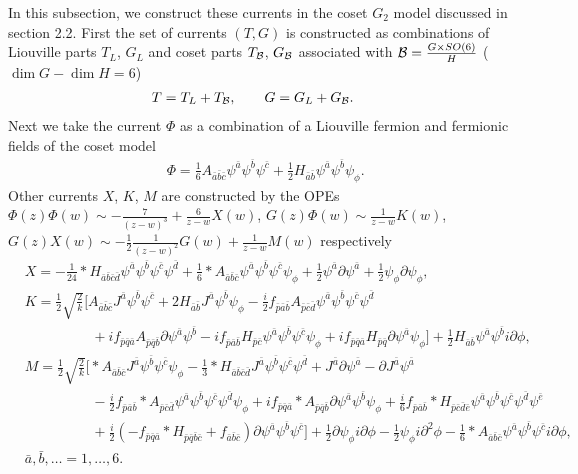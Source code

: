 \documentclass[a4paper,12pt]{article}
\numberwithin{equation}{section}
\newcommand{\del}{\partial}
\newcommand{\nn}{\nonumber}
\newcommand{\As}{*A}
\newcommand{\Hs}{*H}
\newcommand{\psil}{\psi_{\phi}}
\newcommand{\Jh}{J}
\newcommand{\Bcal}{{\cal B}}
\newcommand{\gh}[1]{\bar{#1}}
\newcommand{\ab}{\gh a}
\newcommand{\bb}{\gh b}
\newcommand{\cb}{\gh c}
\newcommand{\db}{\gh d}
\newcommand{\eb}{\gh e}
\newcommand{\pb}{\gh p}
\newcommand{\qb}{\gh q}
\begin{document}
In this subsection, we construct these currents in the coset $G_2$ model 
discussed in section 2.2. First the set of currents $(T,G)$ is 
constructed as combinations of Liouville parts $T_L$, $G_L$ 
and coset parts $T_{\cal B}$, $G_{\cal B}$ 
associated with 
${\cal B}=\frac{G\times SO(6)}{H}$ ($\dim G-\dim H =6$)
\begin{align*}
 &T=T_{L}+T_{\Bcal},\qquad G=G_{L}+G_{\Bcal}.
\end{align*}
Next we take the current $\Phi$ as 
a combination of a Liouville fermion and 
fermionic fields of the coset model
\begin{align*}
 &\Phi=\frac16 A_{\ab\bb\cb}\psi^{\ab}\psi^{\bb}\psi^{\cb}
         +\frac12 H_{\ab\bb}\psi^{\ab}\psi^{\bb}\psil .
\end{align*}
Other currents $X$, $K$, $M$ are constructed
 by the OPEs $\Phi(z)\Phi(w)\sim -\frac{7}{(z-w)^3}+\frac{6}{z-w}X(w)$, 
$G(z)\Phi(w)\sim \frac{1}{z-w}K(w)$, $G(z)X(w)\sim -\frac{1}{2}
\frac{1}{(z-w)^2}G(w)+\frac{1}{z-w}M(w)$
respectively  
\begin{align*}
 &X=-\frac{1}{24}\Hs_{\ab\bb\cb\db}\psi^{\ab}\psi^{\bb}\psi^{\cb}\psi^{\db}
   +\frac{1}{6}\As_{\ab\bb\cb}\psi^{\ab}\psi^{\bb}\psi^{\cb}\psil
 +\frac12 \psi^{\ab}\del\psi^{\ab}+\frac12 \psil\del\psil ,\\
 &K=\frac12\sqrt{\frac 2k}\Bigg[
    A_{\ab\bb\cb}\Jh^{\ab}\psi^{\bb}\psi^{\cb}
    +2 H_{\ab\bb}\Jh^{\ab}\psi^{\bb}\psil
    -\frac{i}{2}f_{\pb\ab\bb}A_{\pb\cb\db}\psi^{\ab}\psi^{\bb}\psi^{\cb}\psi^{\db}
  \nn \\& \hspace{2cm}
    +if_{\pb\qb\ab}A_{\pb\qb\bb}\del\psi^{\ab}\psi^{\bb}
    -if_{\pb\ab\bb}H_{\pb\cb}\psi^{\ab}\psi^{\bb}\psi^{\cb}\psil
    +if_{\pb\qb\ab}H_{\pb\qb}\del\psi^{\ab}\psi_{\phi}
    \Bigg]+\frac12 H_{\ab\bb}\psi^{\ab}\psi^{\bb}i\del\phi,\\
 &M=\frac12 \sqrt{\frac 2k}\Bigg[
     \As_{\ab\bb\cb}\Jh^{\ab}\psi^{\bb}\psi^{\cb}\psil
     -\frac13\Hs_{\ab\bb\cb\db}\Jh^{\ab}\psi^{\bb}\psi^{\cb}\psi^{\db}
     +\Jh^{\ab}\del\psi^{\ab}
     -\del\Jh^{\ab}\psi^{\ab}
   \nn\\&\hspace{2cm}
     -\frac{i}{2}f_{\pb\ab\bb}\As_{\pb\cb\db}
           \psi^{\ab}\psi^{\bb}\psi^{\cb}\psi^{\db}\psil 
     +if_{\pb\qb\ab}\As_{\pb\qb\bb}\del\psi^{\ab}\psi^{\bb}\psil
     +\frac{i}{6}f_{\pb\ab\bb}\Hs_{\pb\cb\db\eb}
           \psi^{\ab}\psi^{\bb}\psi^{\cb}\psi^{\db}\psi^{\eb}
   \nn\\&\hspace{2cm}
     +\frac{i}{2}\left(-f_{\pb\qb\ab}\Hs_{\pb\qb\bb\cb}+f_{\ab\bb\cb}\right)
                  \del\psi^{\ab}\psi^{\bb}\psi^{\cb}
    \Bigg]+\frac12 \del\psil i\del\phi -\frac12 \psil i\del^2\phi
      -\frac16\As_{\ab\bb\cb}\psi^{\ab}\psi^{\bb}\psi^{\cb}i\del\phi,\\
 &\ab,\bb,\dots=1,\dots,6.
\end{align*}
\end{document}
